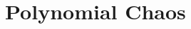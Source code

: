 \documentclass{beamer}
\newcommand\dx{\, \mathrm{d}}
\begin{document}

\section[Poly. Chaos]{Polynomial Chaos}
\subsection{}
\end{document}
